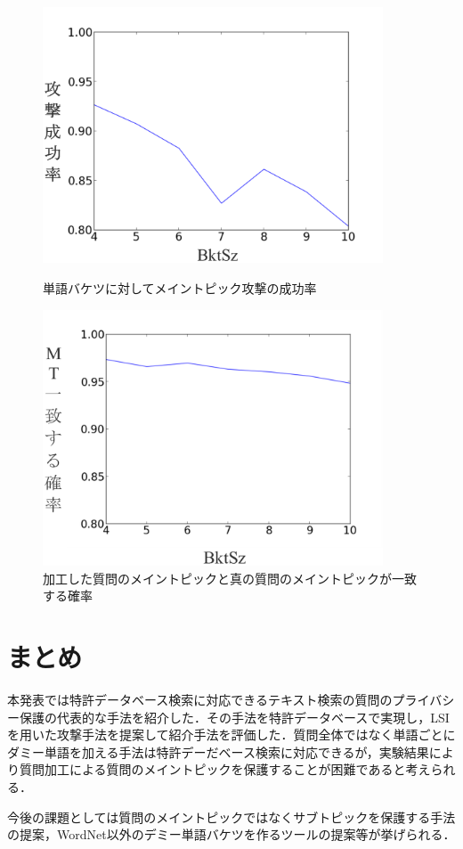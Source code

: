 \documentclass{jsarticle}
\theoremstyle{definition}
\begin{document}
\begin{figure}
\begin{minipage}[t]{0.5\linewidth}
\centering
\includegraphics[width=0.9\textwidth]{rk21.eps}
\caption{単語バケツに対してメイントピック攻撃の成功率}
\label{fig:mt1}
\end{minipage}%
\begin{minipage}[t]{0.5\linewidth}
\centering
\includegraphics[width=0.9\textwidth]{rk22.eps}
\caption{加工した質問のメイントピックと真の質問のメイントピックが一致する確率}
\label{fig:mt2}
\end{minipage}
\end{figure}

\section{まとめ}
本発表では特許データベース検索に対応できるテキスト検索の質問のプライバシー保護の代表的な手法を紹介した．その手法を特許データベースで実現し，LSIを用いた攻撃手法を提案して紹介手法を評価した．質問全体ではなく単語ごとにダミー単語を加える手法は特許デーだベース検索に対応できるが，実験結果により質問加工による質問のメイントピックを保護することが困難であると考えられる．

今後の課題としては質問のメイントピックではなくサブトピックを保護する手法の提案，WordNet以外のデミー単語バケツを作るツールの提案等が挙げられる．


\end{document}
